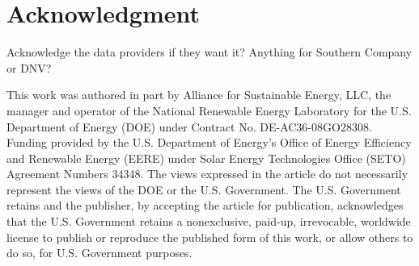 \documentclass[conference]{IEEEtran}
\begin{document}
\section*{Acknowledgment}

Acknowledge the data providers if they want it? Anything for Southern Company or DNV?

This work was authored in part by Alliance for Sustainable Energy, LLC, the manager and operator of the National Renewable Energy Laboratory for the U.S. Department of Energy (DOE) under Contract No. DE-AC36-08GO28308. Funding provided by the U.S. Department of Energy’s Office of Energy Efficiency and Renewable Energy (EERE) under Solar Energy Technologies Office (SETO) Agreement Numbers 34348. The views expressed in the article do not necessarily represent the views of the DOE or the U.S. Government. The U.S. Government retains and the publisher, by accepting the article for publication, acknowledges that the U.S. Government retains a nonexclusive, paid-up, irrevocable, worldwide license to publish or reproduce the published form of this work, or allow others to do so, for U.S. Government purposes.



\end{document}
